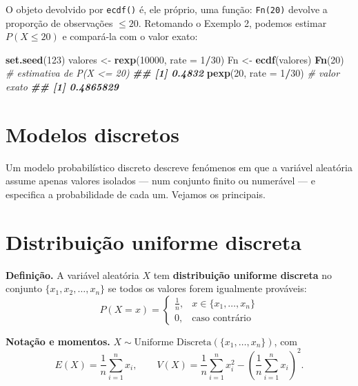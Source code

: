 \documentclass[
  portuguese,
  11pt,
  openany]{book}
\newenvironment{Shaded}{\begin{snugshade}}{\end{snugshade}}
\newcommand{\AttributeTok}[1]{\textcolor[rgb]{0.13,0.29,0.53}{#1}}
\newcommand{\CommentTok}[1]{\textcolor[rgb]{0.56,0.35,0.01}{\textit{#1}}}
\newcommand{\DecValTok}[1]{\textcolor[rgb]{0.00,0.00,0.81}{#1}}
\newcommand{\DocumentationTok}[1]{\textcolor[rgb]{0.56,0.35,0.01}{\textbf{\textit{#1}}}}
\newcommand{\FunctionTok}[1]{\textcolor[rgb]{0.13,0.29,0.53}{\textbf{#1}}}
\newcommand{\NormalTok}[1]{#1}
\newcommand{\OtherTok}[1]{\textcolor[rgb]{0.56,0.35,0.01}{#1}}
\newcommand{\SpecialCharTok}[1]{\textcolor[rgb]{0.81,0.36,0.00}{\textbf{#1}}}
\begin{document}
O objeto devolvido por \texttt{ecdf()} é, ele próprio, uma função: \texttt{Fn(20)} devolve a proporção
de observações \(\leq 20\). Retomando o Exemplo 2, podemos estimar \(P(X \leq 20)\) e
compará-la com o valor exato:

\begin{Shaded}
\begin{Highlighting}[]
\FunctionTok{set.seed}\NormalTok{(}\DecValTok{123}\NormalTok{)}
\NormalTok{valores }\OtherTok{\textless{}{-}} \FunctionTok{rexp}\NormalTok{(}\DecValTok{10000}\NormalTok{, }\AttributeTok{rate =} \DecValTok{1}\SpecialCharTok{/}\DecValTok{30}\NormalTok{)}
\NormalTok{Fn }\OtherTok{\textless{}{-}} \FunctionTok{ecdf}\NormalTok{(valores)}
\FunctionTok{Fn}\NormalTok{(}\DecValTok{20}\NormalTok{)                }\CommentTok{\# estimativa de P(X \textless{}= 20)}
\DocumentationTok{\#\# [1] 0.4832}
\FunctionTok{pexp}\NormalTok{(}\DecValTok{20}\NormalTok{, }\AttributeTok{rate =} \DecValTok{1}\SpecialCharTok{/}\DecValTok{30}\NormalTok{) }\CommentTok{\# valor exato}
\DocumentationTok{\#\# [1] 0.4865829}
\end{Highlighting}
\end{Shaded}

\section{Modelos discretos}\label{modelos-discretos}

Um modelo probabilístico discreto descreve fenómenos em que a variável aleatória assume
apenas valores isolados --- num conjunto finito ou numerável --- e especifica a
probabilidade de cada um. Vejamos os principais.

\section{Distribuição uniforme discreta}\label{distribuiuxe7uxe3o-uniforme-discreta}

\textbf{Definição.} A variável aleatória \(X\) tem \textbf{distribuição uniforme discreta} no
conjunto \(\{x_1, x_2, \ldots, x_n\}\) se todos os valores forem igualmente prováveis:
\[P(X = x) = \begin{cases} \frac{1}{n}, & x \in \{x_1, \ldots, x_n\} \\ 0, & \text{caso contrário} \end{cases}\]

\textbf{Notação e momentos.} \(X \sim \text{Uniforme Discreta}(\{x_1, \ldots, x_n\})\), com
\[E(X) = \frac{1}{n}\sum_{i=1}^n x_i, \qquad V(X) = \frac{1}{n}\sum_{i=1}^n x_i^2 - \left(\frac{1}{n}\sum_{i=1}^n x_i\right)^2.\]
\end{document}
